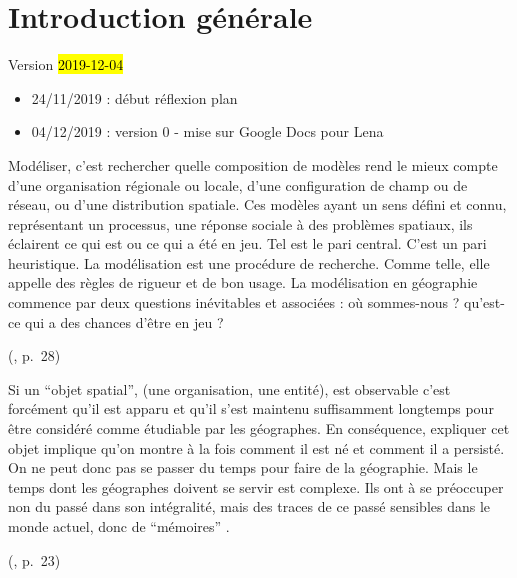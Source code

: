 \setcounter{chapter}{0}
\graphicspath{{chap0-2-Intro/}}

\chapter*{Introduction générale}
\label{chap:intro}
\vspace*{-5em}
\begin{center}
{\large Version \hl{2019-12-04}}
\end{center}
\vspace*{-1em}
\begin{itemize}
	\item 24/11/2019 : début réflexion plan
	\item 04/12/2019 : version 0 - mise sur Google Docs pour Lena
\end{itemize}



\epigraph{
	\og 
	Modéliser, \textelp{} c'est rechercher quelle composition de modèles rend le mieux compte d'une organisation régionale ou locale, d'une configuration de champ ou de réseau, ou d'une distribution spatiale.
	\textelp{}
	Ces modèles ayant un sens défini et connu, représentant un processus, une réponse sociale à des problèmes spatiaux, ils éclairent ce qui est ou ce qui a été en jeu.
	Tel est le pari central. C'est un pari heuristique.
	La modélisation est une procédure de recherche. 
	Comme telle, elle appelle des règles de rigueur et de bon usage.
	La modélisation en géographie commence par deux questions inévitables et associées : où sommes-nous ? qu'est-ce qui a des chances d'être en jeu ?
	\fg{}
}{ (\citeyear{brunet2000modeles}, p.~28)}

\vspace*{-2.5em}\epigraph{
\og Si un ``objet spatial'', (une organisation, une entité), est observable c'est forcément qu'il est apparu et qu'il s'est maintenu suffisamment longtemps pour être considéré comme étudiable par les géographes.
En conséquence, expliquer cet objet implique qu'on montre à la fois comment il est né et comment il a persisté.
On ne peut donc pas se passer du temps pour faire de la géographie.
Mais le temps dont les géographes doivent se servir est complexe.
Ils ont à se préoccuper non du passé dans son intégralité, mais des traces de ce passé sensibles dans le monde actuel, donc de ``mémoires''
\fg{}.
}{ (\citeyear{durand-dastes_jamais_1999}, p.~23)}


